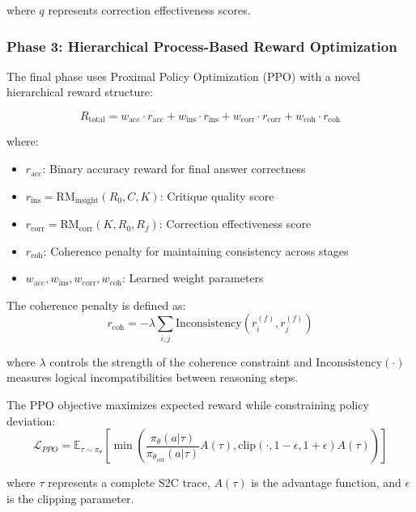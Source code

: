 \documentclass[10pt,twocolumn]{article}
\newcommand{\ssc}{\textsc{S2C}}
\newcommand{\RMinsight}{\text{RM}_{\text{insight}}}
\newcommand{\RMcorr}{\text{RM}_{\text{corr}}}
\begin{document}
where $q$ represents correction effectiveness scores.

\subsubsection{Phase 3: Hierarchical Process-Based Reward Optimization}

The final phase uses Proximal Policy Optimization (PPO) with a novel hierarchical reward structure:

\begin{equation}
R_{\text{total}} = w_{\text{acc}} \cdot r_{\text{acc}} + w_{\text{ins}} \cdot r_{\text{ins}} + w_{\text{corr}} \cdot r_{\text{corr}} + w_{\text{coh}} \cdot r_{\text{coh}}
\end{equation}

where:
\begin{itemize}
\item $r_{\text{acc}}$: Binary accuracy reward for final answer correctness
\item $r_{\text{ins}} = \RMinsight(R_0, C, K)$: Critique quality score
\item $r_{\text{corr}} = \RMcorr(K, R_0, R_f)$: Correction effectiveness score
\item $r_{\text{coh}}$: Coherence penalty for maintaining consistency across stages
\item $w_{\text{acc}}, w_{\text{ins}}, w_{\text{corr}}, w_{\text{coh}}$: Learned weight parameters
\end{itemize}

The coherence penalty is defined as:
\begin{equation}
r_{\text{coh}} = -\lambda \sum_{i,j} \text{Inconsistency}(r_i^{(f)}, r_j^{(f)})
\end{equation}

where $\lambda$ controls the strength of the coherence constraint and $\text{Inconsistency}(\cdot)$ measures logical incompatibilities between reasoning steps.

The PPO objective maximizes expected reward while constraining policy deviation:
\begin{equation}
\mathcal{L}_{PPO} = \mathbb{E}_{\tau \sim \pi_\theta} \left[ \min\left( \frac{\pi_\theta(a|\tau)}{\pi_{\theta_{\text{old}}}(a|\tau)} A(\tau), \text{clip}(\cdot, 1-\epsilon, 1+\epsilon) A(\tau) \right) \right]
\end{equation}

where $\tau$ represents a complete \ssc{} trace, $A(\tau)$ is the advantage function, and $\epsilon$ is the clipping parameter.
\end{document}
